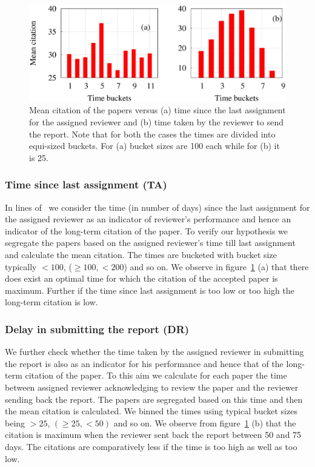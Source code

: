 \begin{figure}
\centering
\includegraphics[scale = 0.28]{./texfiles/Chapter_4/jcdl/figures/rev_all.eps}
\caption{\label{fig:rev} Mean citation of the papers versus (a) time since the last assignment for the assigned reviewer and (b) time taken by the reviewer to send the report. Note that for both the cases the times are divided into equi-sized buckets. For (a) bucket sizes are 100 each while for (b) it is 25.}
\end{figure}

\subsubsection*{Time since last assignment (TA)}

In lines of~\cite{sikdar2016anomalies} we consider the time (in number of days) since the last assignment for the assigned reviewer as an indicator of reviewer's performance and hence an indicator of the long-term citation of the paper. To verify our hypothesis we segregate the papers based on the assigned reviewer's time till last assignment and calculate the mean citation. The times are bucketed with bucket size typically $< 100$, ($\geq 100, < 200$) and so on. We observe in figure~\ref{fig:rev} (a) that there does exist an optimal time for which the citation of the accepted paper is maximum. Further if the time since last assignment is too low or too high the long-term citation is low.   

\subsubsection*{Delay in submitting the report (DR)}

We further check whether the time taken by the assigned reviewer in submitting the report is also as an indicator for his performance and hence that of the long-term citation of the paper. To this aim we calculate for each paper the time between assigned reviewer acknowledging to review the paper and the reviewer sending back the report. The papers are segregated based on this time and then the mean citation is calculated. 
We binned the times using typical bucket sizes being $>25$, $(\geq 25, < 50)$ and so on. We observe from figure~\ref{fig:rev} (b) that the citation is maximum when the reviewer sent back the report between 50 and 75 days. The citations are comparatively less if the time is too high as well as too low. 

\medskip